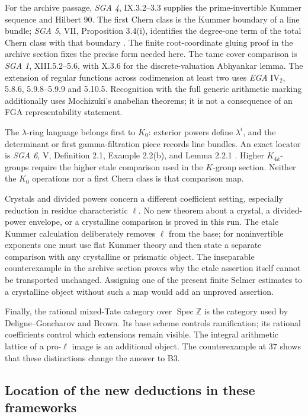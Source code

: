 \documentclass[11pt,a4paper]{article}
\theoremstyle{definition}
\begin{document}
For the archive passage, \emph{SGA 4}, IX.3.2--3.3 supplies the
prime-invertible Kummer sequence and Hilbert 90. The first Chern class
is the Kummer boundary of a line bundle; \emph{SGA 5}, VII,
Proposition 3.4(i), identifies the degree-one term of the total Chern
class with that boundary \cite{SGA5}. The finite root-coordinate gluing proof in
the archive section fixes the precise form needed here. The tame
cover comparison is \emph{SGA 1}, XIII.5.2--5.6, with X.3.6 for the
discrete-valuation Abhyankar lemma. The extension of regular functions
across codimension at least two uses \emph{EGA} $\mathrm{IV}_2$,
5.8.6, 5.9.8--5.9.9 and 5.10.5. Recognition with the full generic
arithmetic marking additionally uses Mochizuki's anabelian theorems;
it is not a consequence of an FGA representability statement.

The $\lambda$-ring language belongs first to $K_0$: exterior powers
define $\lambda^i$, and the determinant or first gamma-filtration
piece records line bundles. An exact locator is \emph{SGA 6}, V,
Definition 2.1, Example 2.2(b), and Lemma 2.2.1 \cite{SGA6}. Higher $K_{4k}$-groups
require the higher etale comparison used in the $K$-group section. Neither
the $K_0$ operations nor a first Chern class is that comparison map.

Crystals and divided powers concern a different coefficient setting,
especially reduction in residue characteristic $\ell$. No new theorem
about a crystal, a divided-power envelope, or a crystalline comparison
is proved in this run. The etale Kummer calculation deliberately removes
$\ell$ from the base; for noninvertible exponents one must use flat
Kummer theory and then state a separate comparison with any crystalline
or prismatic object. The inseparable counterexample in the archive
section proves why the etale assertion itself cannot be transported
unchanged. Assigning one of the present finite Selmer estimates to a
crystalline object without such a map would add an unproved assertion.

Finally, the rational mixed-Tate category over $\operatorname{Spec}
\mathbb Z$ is the category used by Deligne--Goncharov and Brown. Its
base scheme controls ramification; its rational coefficients control
which extensions remain visible. The integral arithmetic lattice of a
pro-$\ell$ image is an additional object. The counterexample at $37$
shows that these distinctions change the answer to B3.

\subsection{Location of the new deductions in these frameworks}
\end{document}
